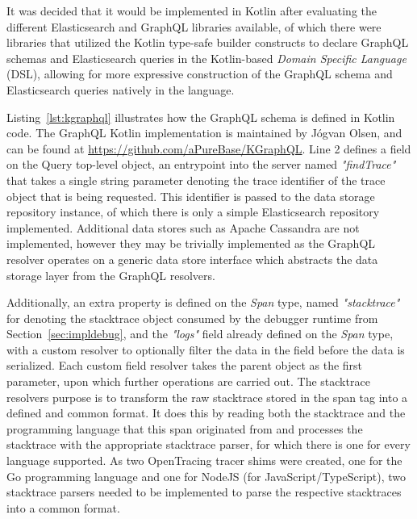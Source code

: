 \documentclass[12pt,pdftex,titlepage]{report}
\begin{document}
                It was decided that it would be implemented in Kotlin after evaluating the different Elasticsearch and GraphQL libraries available, of which there were libraries 
                that utilized the Kotlin type-safe builder constructs\cite{dsl} to declare GraphQL schemas and Elasticsearch queries in the Kotlin-based \textit{Domain Specific Language} (DSL), allowing
                for more expressive construction of the GraphQL schema and Elasticsearch queries natively in the language. 
                
                Listing~\ref{lst:kgraphql} illustrates how the GraphQL schema is defined in Kotlin code. The GraphQL Kotlin implementation is maintained by Jógvan Olsen, and can be found at 
                \url{https://github.com/aPureBase/KGraphQL}. Line 2 defines a field on the Query top-level object, an entrypoint into the server named \textit{"findTrace"} that takes a single string parameter 
                denoting the trace identifier of the trace object that is being requested. This identifier is passed to the data storage repository instance, of which there is only a simple Elasticsearch 
                repository implemented. Additional data stores such as Apache Cassandra are not implemented, however they may be trivially implemented as the GraphQL resolver operates on a generic data store 
                interface which abstracts the data storage layer from the GraphQL resolvers.

                Additionally, an extra property is defined on the \textit{Span} type, named \textit{"stacktrace"} for denoting the stacktrace object consumed by the debugger runtime from Section~\ref{sec:impldebug}, 
                and the \textit{"logs"} field already defined on the \textit{Span} type, with a custom resolver to optionally filter the data in the field before the data is serialized. Each custom field resolver takes
                the parent object as the first parameter, upon which further operations are carried out. The stacktrace resolvers purpose is to transform the raw stacktrace stored in the span tag into a defined and common
                format. It does this by reading both the stacktrace and the programming language that this span originated from and processes the stacktrace with the appropriate stacktrace parser, for which there is one
                for every language supported. As two OpenTracing tracer shims were created, one for the Go programming language and one for NodeJS (for JavaScript/TypeScript), two stacktrace parsers needed to be implemented 
                to parse the respective stacktraces into a common format.
\end{document}
